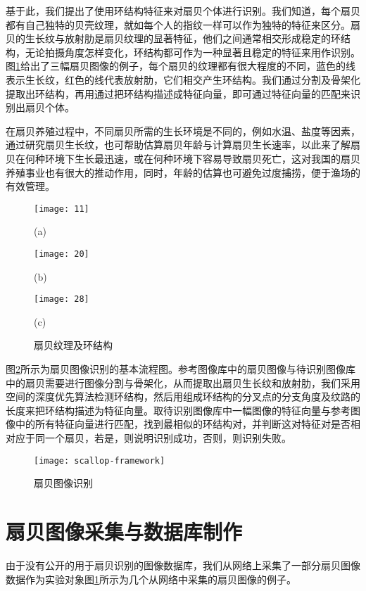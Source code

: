 基于此，我们提出了使用环结构特征来对扇贝个体进行识别。我们知道，每个扇贝都有自己独特的贝壳纹理，就如每个人的指纹一样可以作为独特的特征来区分。扇贝的生长纹与放射肋是扇贝纹理的显著特征，他们之间通常相交形成稳定的环结构，无论拍摄角度怎样变化，环结构都可作为一种显著且稳定的特征来用作识别。图\ref{fig:scallop}给出了三幅扇贝图像的例子，每个扇贝的纹理都有很大程度的不同，蓝色的线表示生长纹，红色的线代表放射肋，它们相交产生环结构。我们通过分割及骨架化提取出环结构，再用通过把环结构描述成特征向量，即可通过特征向量的匹配来识别出扇贝个体。

在扇贝养殖过程中，不同扇贝所需的生长环境是不同的，例如水温、盐度等因素，通过研究扇贝生长纹，也可帮助估算扇贝年龄\cite{hurley}与计算扇贝生长速率\cite{david}，以此来了解扇贝在何种环境下生长最迅速，或在何种环境下容易导致扇贝死亡，这对我国的扇贝养殖事业也有很大的推动作用，同时，年龄的估算也可避免过度捕捞，便于渔场的有效管理。

\begin{figure}
\centering
  \begin{minipage}[b]{0.3\textwidth} 
      \centering 
      \texttt{[image: 11]}
        \centerline{(a)}\medskip
    \end{minipage}
  \begin{minipage}[b]{0.3\textwidth}
    \centering
    \texttt{[image: 20]}
      \centerline{(b)}\medskip
  \end{minipage}
  \begin{minipage}[b]{0.3\textwidth}
    \centering
    \texttt{[image: 28]}
      \centerline{(c)}\medskip
  \end{minipage}
\caption{扇贝纹理及环结构}
\label{fig:scallop}
\end{figure}



图\ref{fig:scallop-framework}所示为扇贝图像识别的基本流程图。参考图像库中的扇贝图像与待识别图像库中的扇贝需要进行图像分割与骨架化，从而提取出扇贝生长纹和放射肋，我们采用空间的深度优先算法检测环结构，然后用组成环结构的分叉点的分支角度及纹路的长度来把环结构描述为特征向量。取待识别图像库中一幅图像的特征向量与参考图像中的所有特征向量进行匹配，找到最相似的环结构对，并判断这对特征对是否相对应于同一个扇贝，若是，则说明识别成功，否则，则识别失败。


\begin{figure}[!ht]
  \centering
  \texttt{[image: scallop-framework]}
  \caption{扇贝图像识别}
  \label{fig:scallop-framework}
\end{figure}
\section{扇贝图像采集与数据库制作}
\label{}
由于没有公开的用于扇贝识别的图像数据库，我们从网络上采集了一部分扇贝图像数据作为实验对象图\ref{fig:scallop}所示为几个从网络中采集的扇贝图像的例子。


